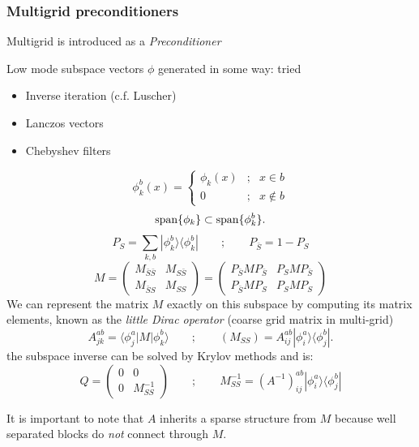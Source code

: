 \documentclass[pdf,ps,8pt]{beamer}
\newcommand{\beq}{\begin{equation*}}
\newcommand{\eeq}{\end{equation*}}
\begin{document}
\begin{frame}[fragile]\small\frametitle{Multigrid preconditioners}

Multigrid is introduced as a \emph{Preconditioner}

Low mode subspace vectors $\phi$ generated in some way: tried
\begin{itemize}
\item Inverse iteration (c.f. Luscher)
\item Lanczos vectors
\item Chebyshev filters
\end{itemize}

\beq
\phi^b_k(x) = \left\{ \begin{array}{ccc} 
  \phi_k(x) &;& x\in b\\
  0 &;& x \not\in b
\end{array}
\right.
\eeq 
\beq{\rm span} \{ \phi_k\}\subset 
{\rm span} \{ \phi_k^b\} .\eeq
\beq
P_S =  \sum_{k,b} |\phi^b_k\rangle \langle \phi^b_k | \quad\quad ; \quad\quad P_{\bar{S}} = 1 - P_S 
\eeq
\beq
M=
\left(
\begin{array}{cc}
M_{\bar{S}\bar{S}} & M_{S\bar{S}}\\
M_{\bar{S}S} &M_{SS}
\end{array}
\right)=
\left(
\begin{array}{cc}
P_{\bar{S}} M P_{\bar{S}}  &  P_S M P_{\bar{S}}\\
 P_{\bar{S}} M P_S &   P_S M P_S
\end{array}
\right)
\eeq
We can represent the matrix $M$ exactly on this subspace by computing its matrix elements, 
known as the \emph{little Dirac operator} (coarse grid matrix in multi-grid)
\beq
A^{ab}_{jk} = \langle \phi^a_j| M | \phi^b_k\rangle
\quad\quad ; \quad\quad
(M_{SS}) = A_{ij}^{ab} |\phi_i^a\rangle \langle \phi_j^b |.
\eeq
the subspace inverse can be solved by Krylov methods and is:
\beq
Q =
\left( \begin{array}{cc}
0 & 0 \\ 0 & M_{SS}^{-1}
\end{array} \right) 
\quad\quad ; \quad\quad
M_{SS}^{-1} = (A^{-1})^{ab}_{ij} |\phi^a_i\rangle \langle \phi^b_j |
\eeq

It is important to note that $A$ inherits a sparse structure from $M$ because well separated blocks do \emph{not} connect through $M$.
\end{frame}
\end{document}
